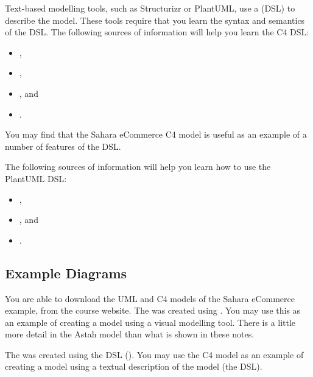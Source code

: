 Text-based modelling tools, such as Structurizr or PlantUML, use a
 (DSL) to describe the model.
These tools require that you learn the syntax and semantics of the DSL.
The following sources of information will help you learn the C4 DSL:
\begin{itemize}[nosep]
    \item {},
    \item {}, 
    \item {}, and
    \item {}.
\end{itemize}
You may find that the Sahara eCommerce C4 model is useful as an example of a number of features of the DSL.

The following sources of information will help you learn how to use the PlantUML DSL:
\begin{itemize}[nosep]
    \item {},
    \item {}, and
    \item {}.
\end{itemize}

\subsection{Example Diagrams}
You are able to download the UML and C4 models of the Sahara eCommerce example, from the course website.
The 
was created using .
You may use this as an example of creating a model using a visual modelling tool.
There is a little more detail in the Astah model than what is shown in these notes.

The 
was created using the  DSL
().
You may use the C4 model as an example of creating a model using a textual description of the model (the DSL).
